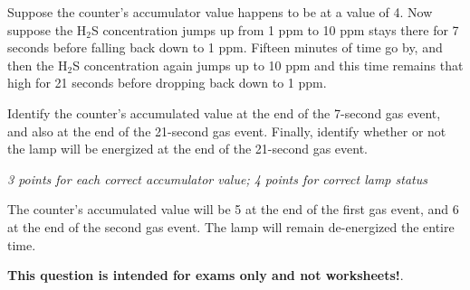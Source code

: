 Suppose the counter's accumulator value happens to be at a value of 4.  Now suppose the H$_{2}$S concentration jumps up from 1 ppm to 10 ppm stays there for 7 seconds before falling back down to 1 ppm.  Fifteen minutes of time go by, and then the H$_{2}$S concentration again jumps up to 10 ppm and this time remains that high for 21 seconds before dropping back down to 1 ppm.

\vskip 10pt

Identify the counter's accumulated value at the end of the 7-second gas event, and also at the end of the 21-second gas event.  Finally, identify whether or not the lamp will be energized at the end of the 21-second gas event.







{\it 3 points for each correct accumulator value; 4 points for correct lamp status}

\vskip 10pt

The counter's accumulated value will be 5 at the end of the first gas event, and 6 at the end of the second gas event.  The lamp will remain de-energized the entire time.







{\bf This question is intended for exams only and not worksheets!}.


